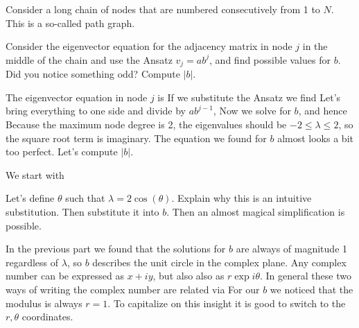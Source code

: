 Consider a long chain of nodes that are numbered consecutively from 1 to $N$. This is a so-called path graph. 

\subquestion 
Consider the eigenvector equation for the adjacency matrix in node $j$ in the middle of the chain and use the Ansatz $v_j=a b^j$, and find possible values for $b$. Did you notice something odd? Compute $|b|$. 

\solution 
The eigenvector equation in node $j$ is 
If we substitute the Ansatz we find
Let's bring everything to one side and divide by $ab^{j-1}$,
Now we solve for $b$, 
and hence 
Because the maximum node degree is 2, the eigenvalues should be $-2\leq \lambda \leq 2$, so the square root term is imaginary. The equation we found for $b$ almost looks a bit too perfect. Let's compute $|b|$. 

We start with 

\subquestion Let's define $\theta$ such that $\lambda=2\cos(\theta)$. Explain why this is an intuitive substitution. Then substitute it into $b$. Then an almost magical simplification is possible.

\solution 
In the previous part we found that the solutions for $b$ are always of magnitude 1 regardless of $\lambda$, so $b$ describes the unit circle in the complex plane. Any complex number can be expressed as  
$x+iy$, but also also as $r\exp{i\theta}$. In general these two ways of writing the complex number are related via 
For our $b$ we noticed that the modulus is always $r=1$. To capitalize on this insight it is good to switch to the $r,\theta$ coordinates.

